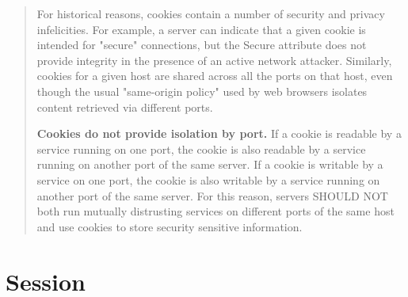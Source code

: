 \documentclass{book}
\begin{document}
\begin{quotation}
For historical reasons, cookies contain a number of security and privacy infelicities. 
For example, a server can indicate that a given cookie is intended for "secure" connections, 
but the Secure attribute does not provide integrity in the presence of an active network attacker. Similarly, cookies for a given host are shared across all the ports on that host, 
even though the usual "same-origin policy" used by web browsers isolates content retrieved via different ports.

\textbf{Cookies do not provide isolation by port.} If a cookie is readable by a service running 
on one port, the cookie is also readable by a service running on another port of the same server. If a cookie is writable by a service on one port, the cookie is also writable by a service 
running on another port of the same server. For this reason, 
servers SHOULD NOT both run mutually distrusting services on different ports of 
the same host and use cookies to store security sensitive information.
\end{quotation}


\section{Session}
\end{document}
